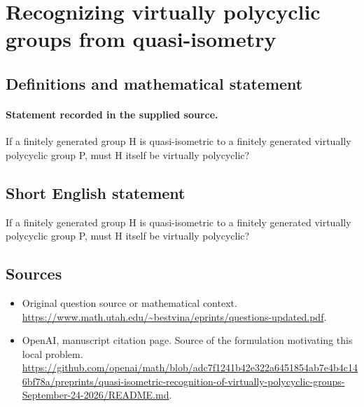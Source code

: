 \documentclass[11pt]{article}
\begin{document}
\section*{Recognizing virtually polycyclic groups from quasi-isometry}\label{statement}
\subsection{Definitions and mathematical statement}
\paragraph{Statement recorded in the supplied source.}
If a finitely generated group H is quasi-isometric to a finitely generated virtually polycyclic group P, must H itself be virtually polycyclic?
\subsection{Short English statement}
If a finitely generated group H is quasi-isometric to a finitely generated virtually polycyclic group P, must H itself be virtually polycyclic?
\subsection{Sources}
\begin{itemize}
\item[S1] Original question source or mathematical context.
\url{https://www.math.utah.edu/~bestvina/eprints/questions-updated.pdf}.
\item[S2] OpenAI, manuscript citation page. Source of the formulation motivating this local problem.
\url{https://github.com/openai/math/blob/adc7f1241b42e322a6451854ab7e4b4c146bf78a/preprints/quasi-isometric-recognition-of-virtually-polycyclic-groups-September-24-2026/README.md}.
\end{itemize}
\end{document}
